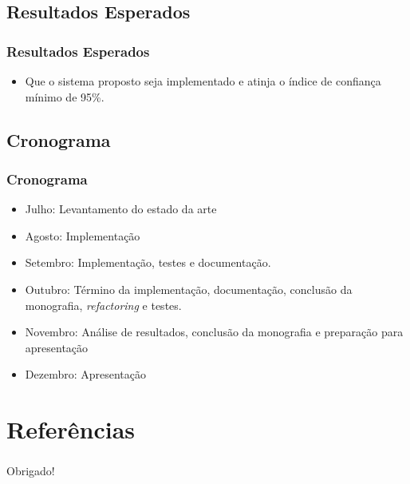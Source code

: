 \documentclass{beamer}
\begin{document}
\subsection{Resultados Esperados}
\begin{frame}
    \frametitle{Resultados Esperados}
    \begin{itemize}
        \item Que o sistema proposto seja implementado e atinja o índice de confiança mínimo de 95\%.
    \end{itemize}
\end{frame}

\subsection{Cronograma}
\begin{frame}
    \frametitle{Cronograma}
    \begin{itemize}
        \item Julho: Levantamento do estado da arte
        \item Agosto: Implementação
        \item Setembro: Implementação, testes e documentação.
        \item Outubro: Término da implementação, documentação, conclusão da monografia, \textit{refactoring} e testes.
        \item Novembro: Análise de resultados, conclusão da monografia e preparação para apresentação
        \item Dezembro: Apresentação
    \end{itemize}
\end{frame}



\nocite{fabriciobuzzeto,weiser2,saocarlos,yang,hewitt,violajones}

\section{Referências}


\begin{frame}
    \frametitle{ }
    \centerline{Obrigado!}
\end{frame}
\end{document}
